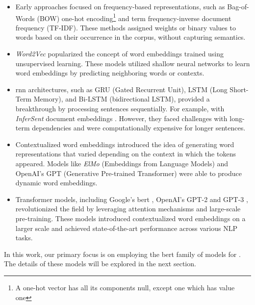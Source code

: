 \begin{itemize}
    \item Early approaches focused on frequency-based representations, such as Bag-of-Words (BOW) one-hot encoding\footnote{A one-hot vector has all its components null, except one which has value one} and term frequency-inverse document frequency (TF-IDF). These methods assigned weights or binary values to words based on their occurrence in the corpus, without capturing semantics.
    \item \emph{Word2Vec}  popularized the concept of word embeddings trained using unsupervised learning. These models utilized shallow neural networks to learn word embeddings by predicting neighboring words or contexts. 
    \item \gls{rnn} architectures, such as GRU (Gated Recurrent Unit), LSTM (Long Short-Term Memory),  and Bi-LSTM (bidirectional LSTM), provided a breakthrough
    by processing sentences sequentially.
    For example, with \emph{InferSent} document embeddings . 
    However, they faced challenges with long-term dependencies and were computationally expensive for longer sentences.
    
    \item  Contextualized word embeddings introduced the idea of generating word representations that varied depending on the context in which the tokens appeared. Models like \emph{ElMo} (Embeddings from Language Models)  and OpenAI's GPT (Generative Pre-trained Transformer)  were able to produce dynamic word embeddings.
    \item Transformer models, including Google's \gls{bert} %
    , OpenAI's GPT-2  and GPT-3 , revolutionized the field by leveraging attention mechanisms and large-scale pre-training. These models introduced contextualized word embeddings on a larger scale and achieved state-of-the-art performance across various NLP tasks. %
\end{itemize}


In this work, our primary focus is on employing the \gls{bert} family of models for \textclassification{}. The details of these models will be explored in the next section.
